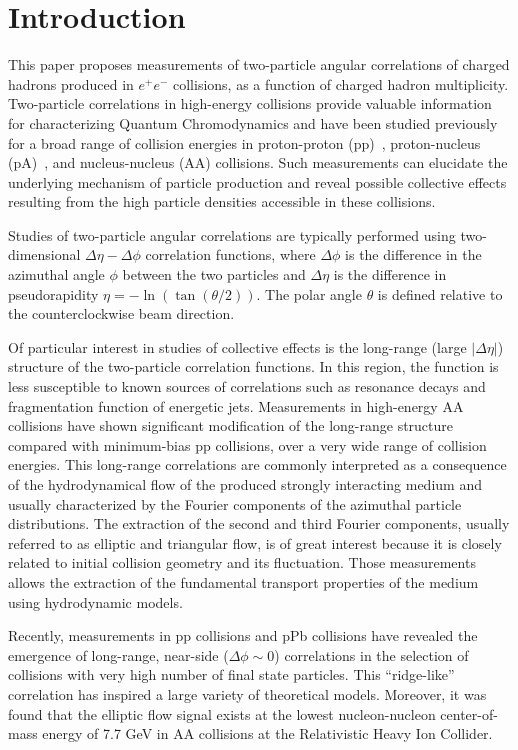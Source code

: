 \section{Introduction}

This paper proposes measurements of two-particle angular correlations of charged hadrons produced in $e^+e^-$ collisions, as a function of charged hadron multiplicity. Two-particle correlations in high-energy collisions provide valuable information for characterizing Quantum Chromodynamics and have been studied previously for a broad range of collision energies in proton-proton (pp)~\cite{Khachatryan:2010gv}, proton-nucleus (pA)~\cite{CMS:2012qk}, and nucleus-nucleus (AA) collisions. Such measurements can elucidate the underlying mechanism of particle production and reveal possible collective effects resulting from the high particle densities accessible in these collisions.

Studies of two-particle angular correlations are typically performed using two-dimensional $\Delta\eta-\Delta\phi$ correlation functions, where $\Delta\phi$ is the difference in the azimuthal angle $\phi$ between the two particles and $\Delta\eta$ is the difference in pseudorapidity $\eta = -\ln(\tan(\theta/2))$. The polar angle $\theta$ is defined relative to the counterclockwise beam direction.

Of particular interest in studies of collective effects is the long-range (large $|\Delta\eta|$) structure of the two-particle correlation functions. In this region, the function is less susceptible to known sources of correlations such as resonance decays and fragmentation function of energetic jets. Measurements in high-energy AA collisions have shown significant modification of the long-range structure compared with minimum-bias pp collisions, over a very wide range of collision energies. This long-range correlations are commonly interpreted as a consequence of the hydrodynamical flow of the produced strongly interacting medium and usually characterized by the Fourier components of the azimuthal particle distributions. The extraction of the second and third Fourier components, usually referred to as elliptic and triangular flow, is of great interest because it is closely related to initial collision geometry and its fluctuation. Those measurements allows the extraction of the fundamental transport properties of the medium using hydrodynamic models.

Recently, measurements in pp collisions and pPb collisions have revealed the emergence of long-range, near-side ($\Delta\phi\sim 0$) correlations in the selection of collisions with very high number of final state particles. This ``ridge-like'' correlation has inspired a large variety of theoretical models. Moreover, it was found that the elliptic flow signal exists at the lowest nucleon-nucleon center-of-mass energy of 7.7 GeV in AA collisions at the Relativistic Heavy Ion Collider. 

